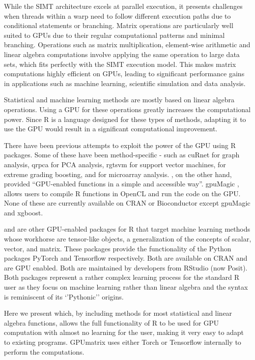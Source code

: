 While the SIMT architecture excels at parallel execution, it presents challenges when threads within a warp need to follow different execution paths due to conditional statements or branching. Matrix operations are particularly well suited to GPUs due to their regular computational patterns and minimal branching. Operations such as matrix multiplication, element-wise arithmetic and linear algebra computations involve applying the same operation to large data sets, which fits perfectly with the SIMT execution model. This makes matrix computations highly efficient on GPUs, leading to significant performance gains in applications such as machine learning, scientific simulation and data analysis.

Statistical and machine learning methods are mostly based on linear algebra operations. Using a GPU for these operations greatly increases the computational power. Since R is a language designed for these types of methods, adapting it to use the GPU would result in a significant computational improvement.

There have been previous attempts to exploit the power of the GPU using R packages. Some of these have been method-specific - such as cuRnet \citep{cuRnet} for graph analysis, qrpca \citep{qrpca} for PCA analysis, rgtsvm \citep{wang2017rgtsvm} for support vector machines,  \citep{XGBoost} for extreme grading boosting, and  \citep{gputools} for microarray analysis.  \citep{gpuR}, on the other hand, provided ``GPU-enabled functions in a simple and accessible way''. gpuMagic \citep{gpuMagic}, allows users to compile R functions in OpenCL and run the code on the GPU. None of these are currently available on CRAN or Bioconductor except gpuMagic and xgboost.

 \citep{torch} and  \citep{tensorflow} are other GPU-enabled packages for R that target machine learning methods whose workhorse are tensor-like objects, a generalization of the concepts of scalar, vector, and matrix. These packages provide the functionality of the Python packages PyTorch and Tensorflow respectively. Both are available on CRAN and are GPU enabled. Both are maintained by developers from RStudio \citep{RStudio} (now Posit). Both packages represent a rather complex learning process for the standard R user as they focus on machine learning rather than linear algebra and the syntax is reminiscent of its `'Pythonic'' origins.

Here we present \textbf{} which, by including methods for most statistical and linear algebra functions, allows the full functionality of R to be used for GPU computation with almost no learning for the user, making it very easy to adapt to existing programs. GPUmatrix uses either Torch or Tensorflow internally to perform the computations.

